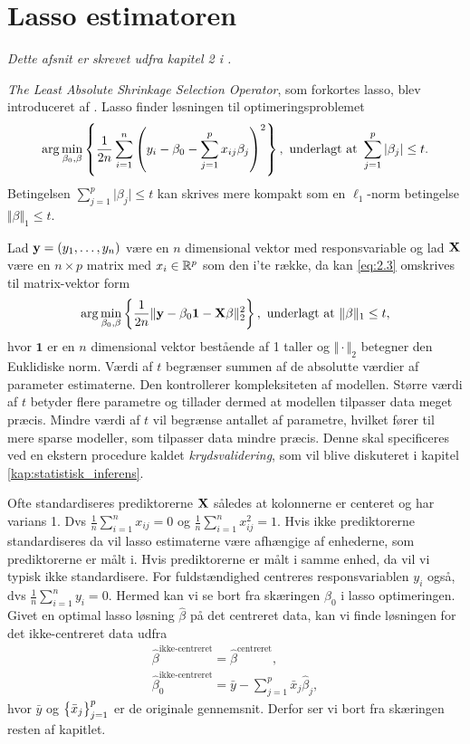 \section{Lasso estimatoren} \label{sec:lasso_estimatoren}
\textit{Dette afsnit er skrevet udfra kapitel 2 i \citep{hastie}.}

\textit{The Least Absolute Shrinkage Selection Operator}, som forkortes lasso, blev introduceret af \citep{lasso}. 
Lasso finder løsningen til optimeringsproblemet
\begin{align}
\arg \min_{\beta_0, \beta} \cbr{\frac{1}{2n} \sum_{i=1}^n \del{y_i - \beta_0 - \sum_{j=1}^p x_{ij} \beta_j}^2}, \ \text{underlagt at } \sum_{j=1}^p \vert \beta_j \vert \leq t. \label{eq:2.3}
\end{align} 
Betingelsen $\sum_{j=1}^p \vert \beta_j \vert \leq t$ kan skrives mere kompakt som en \(\ell_1\)-norm betingelse $\Vert \beta \Vert_1 \leq t$.

Lad \(\mathbf{y}=(y_1, \ldots, y_n)\) være en \(n\) dimensional vektor med responsvariable og lad \(\mathbf{X}\) være en $n \times p$ matrix med $x_i \in \mathbb{R}^p$ som den i'te række, da kan \eqref{eq:2.3} omskrives til matrix-vektor form
\begin{align*}
\arg \min_{\beta_0, \beta} \cbr{\frac{1}{2n} \Vert \y - \beta_0 \mathbf{1} - \X \beta \Vert_2^2}, \ \text{underlagt at } \Vert \beta \Vert_1 \leq t,
\end{align*}
hvor \(\mathbf{1}\) er en \(n\) dimensional vektor bestående af 1 taller og \(\Vert \cdot \Vert_2\) betegner den Euklidiske norm.
Værdi af \(t\) begrænser summen af de absolutte værdier af parameter estimaterne.
Den kontrollerer kompleksiteten af modellen. 
Større værdi af \(t\) betyder flere parametre og tillader dermed at modellen tilpasser data meget præcis.
Mindre værdi af \(t\) vil begrænse antallet af parametre, hvilket fører til mere sparse modeller, som tilpasser data mindre præcis.
Denne skal specificeres ved en ekstern procedure kaldet \textit{krydsvalidering}, som vil blive diskuteret i kapitel \ref{kap:statistisk_inferens}.

Ofte standardiseres prediktorerne \(\mathbf{X}\) således at kolonnerne er centeret og har varians 1. Dvs \(\frac{1}{n} \sum_{i=1}^n x_{ij} = 0\) og \(\frac{1}{n} \sum_{i=1}^n x_{ij}^2=1\). Hvis ikke prediktorerne standardiseres da vil lasso estimaterne være afhængige af enhederne, som prediktorerne er målt i.
Hvis prediktorerne er målt i samme enhed, da vil vi typisk ikke standardisere.
For fuldstændighed centreres responsvariablen $y_i$ også, dvs \(\frac{1}{n} \sum_{i=1}^n y_{i} = 0\).
Hermed kan vi se bort fra skæringen $\beta_0$ i lasso optimeringen.
Givet en optimal lasso løsning \(\hat{\beta}\) på det centreret data, kan vi finde løsningen for det ikke-centreret data udfra
\begin{align*}
\hat{\beta}^{\text{ikke-centreret}} = \hat{\beta}^{\text{centreret}}, \\
\hat{\beta}_0^{\text{ikke-centreret}} = \bar{y} - \sum_{j=1}^p \bar{x}_j \hat{\beta}_j,
\end{align*}
hvor \(\bar{y}\) og \(\cbr{\bar{x}_j}_{j=1}^p\) er de originale gennemsnit.
Derfor ser vi bort fra skæringen resten af kapitlet.

